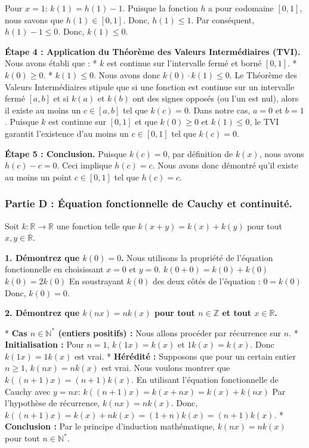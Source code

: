 \documentclass[12pt,a4paper]{report}
\begin{document}
Pour $x=1$:
$k(1) = h(1) - 1$.
Puisque la fonction $h$ a pour codomaine $[0,1]$, nous savons que $h(1) \in [0,1]$.
Donc, $h(1) \le 1$. Par conséquent, $h(1) - 1 \le 0$.
Donc, $k(1) \le 0$.

\textbf{Étape 4 : Application du Théorème des Valeurs Intermédiaires (TVI).}
Nous avons établi que :
*   $k$ est continue sur l'intervalle fermé et borné $[0,1]$.
*   $k(0) \ge 0$.
*   $k(1) \le 0$.
Nous avons donc $k(0) \cdot k(1) \le 0$.
Le Théorème des Valeurs Intermédiaires stipule que si une fonction est continue sur un intervalle fermé $[a,b]$ et si $k(a)$ et $k(b)$ ont des signes opposés (ou l'un est nul), alors il existe au moins un $c \in [a,b]$ tel que $k(c) = 0$.
Dans notre cas, $a=0$ et $b=1$.
Puisque $k$ est continue sur $[0,1]$ et que $k(0) \ge 0$ et $k(1) \le 0$, le TVI garantit l'existence d'au moins un $c \in [0,1]$ tel que $k(c) = 0$.

\textbf{Étape 5 : Conclusion.}
Puisque $k(c) = 0$, par définition de $k(x)$, nous avons $h(c) - c = 0$.
Ceci implique $h(c) = c$.
Nous avons donc démontré qu'il existe au moins un point $c \in [0,1]$ tel que $h(c) = c$.

\subsubsection{Partie D : Équation fonctionnelle de Cauchy et continuité.}

Soit $k: \mathbb{R} \to \mathbb{R}$ une fonction telle que $k(x+y) = k(x) + k(y)$ pour tout $x, y \in \mathbb{R}$.

\textbf{1. Démontrez que $k(0) = 0$.}
Nous utilisons la propriété de l'équation fonctionnelle en choisissant $x=0$ et $y=0$.
$k(0+0) = k(0) + k(0)$
$k(0) = 2k(0)$
En soustrayant $k(0)$ des deux côtés de l'équation :
$0 = k(0)$
Donc, $k(0) = 0$.

\textbf{2. Démontrez que $k(nx) = nk(x)$ pour tout $n \in \mathbb{Z}$ et tout $x \in \mathbb{R}$.}

*   \textbf{Cas $n \in \mathbb{N}^*$ (entiers positifs) :}
    Nous allons procéder par récurrence sur $n$.
    *   \textbf{Initialisation :} Pour $n=1$, $k(1x) = k(x)$ et $1k(x) = k(x)$. Donc $k(1x) = 1k(x)$ est vrai.
    *   \textbf{Hérédité :} Supposons que pour un certain entier $n \ge 1$, $k(nx) = nk(x)$ est vrai.
        Nous voulons montrer que $k((n+1)x) = (n+1)k(x)$.
        En utilisant l'équation fonctionnelle de Cauchy avec $y=nx$:
        $k((n+1)x) = k(x + nx) = k(x) + k(nx)$
        Par l'hypothèse de récurrence, $k(nx) = nk(x)$.
        Donc, $k((n+1)x) = k(x) + nk(x) = (1+n)k(x) = (n+1)k(x)$.
    *   \textbf{Conclusion :} Par le principe d'induction mathématique, $k(nx) = nk(x)$ pour tout $n \in \mathbb{N}^*$.
\end{document}
